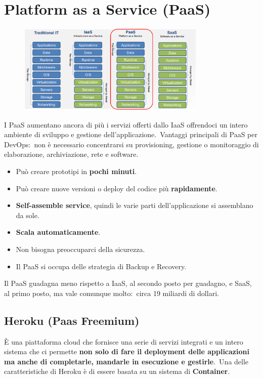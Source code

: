 \chapter{Platform as a Service (PaaS)}

\begin{figure}[H]
    \centering
    \includegraphics[width=0.8\textwidth]{immagini/Paas.png}
\end{figure}

I PaaS aumentano ancora di più i servizi offerti dallo IaaS offrendoci un intero ambiente di sviluppo e gestione dell'applicazione.\
Vantaggi principali di PaaS per DevOps:\ non è necessario concentrarsi su provisioning, gestione o monitoraggio di elaborazione, archiviazione, rete e software.
\begin{itemize}
    \item Può creare prototipi in \textbf{pochi minuti}.
    \item Può creare nuove versioni o deploy del codice più \textbf{rapidamente}.
    \item \textbf{Self-assemble service}, quindi le varie parti dell'applicazione si assemblano da sole.
    \item \textbf{Scala automaticamente}.
    \item Non bisogna preoccuparci della sicurezza.
    \item Il PaaS si occupa delle strategia di Backup e Recovery.
\end{itemize}

\noindent Il PaaS guadagna meno rispetto a IaaS, al secondo posto per guadagno, e SaaS, al primo posto, ma vale comunque molto:\ circa 19 miliardi di dollari.

\section{Heroku (Paas Freemium)}

È una piattaforma cloud che fornisce una serie di servizi integrati e un intero sistema che ci permette \textbf{non solo di fare il deployment delle applicazioni ma anche di completarle, mandarle in esecuzione e gestirle}.\
Una delle caratteristiche di Heroku è di essere basata su un sistema di \textbf{Container}.\


